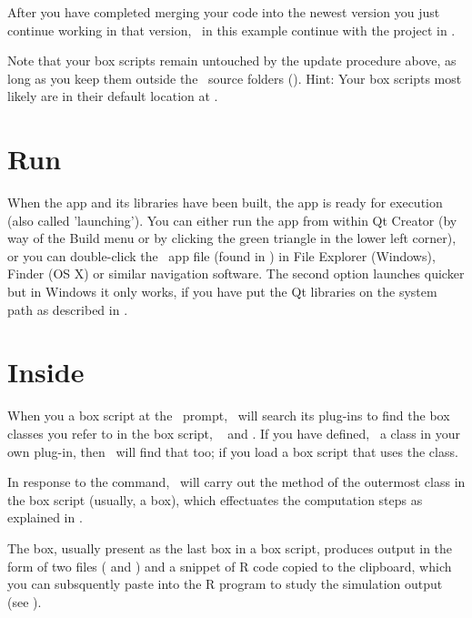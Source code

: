 After you have completed merging your code into the newest version you just continue working in that version, \ie\ in this example continue with the project in .

Note that your box scripts remain untouched by the update procedure above, as long as you keep them outside the \US\ source folders (). Hint: Your box scripts most likely are in their default location at .

\section{Run \protect\US}
When the app and its libraries have been built, the app is ready for execution (also called 'launching'). You can either run the app from within Qt Creator (by way of the Build menu or by clicking the green triangle in the lower left corner), or you can double-click the \US\ app file (found in ) in File Explorer (Windows), Finder (OS X) or similar navigation software. The second option launches quicker but in Windows it only works, if you have put the Qt libraries on the system path as described in .

\section{Inside \protect\US}
When you  a box script at the \US\ prompt, \US\ will search its plug-ins to find the box classes you refer to in the box script, \eg\  and . If you have defined, \eg\ a  class in your own plug-in, then \US\ will find that too; if you load a box script that uses the  class.

In response to the  command, \US\ will carry out the  method of the outermost class in the box script (usually, a  box), which effectuates the computation steps as explained in .

The  box, usually present as the last box in a box script, produces output in the form of two files ( and ) and a snippet of R code copied to the clipboard, which you can subsquently paste into the R program to study the simulation output (see ).



